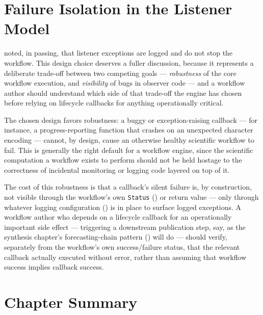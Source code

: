 \section{Failure Isolation in the Listener Model}

 noted, in passing, that listener exceptions are logged
and do not stop the workflow. This design choice deserves a fuller
discussion, because it represents a deliberate trade-off between two
competing goals --- \emph{robustness} of the core workflow execution, and
\emph{visibility} of bugs in observer code --- and a workflow author should
understand which side of that trade-off the engine has chosen before relying
on lifecycle callbacks for anything operationally critical.

The chosen design favors robustness: a buggy or exception-raising callback
--- for instance, a progress-reporting function that crashes on an
unexpected character encoding --- cannot, by design, cause an otherwise
healthy scientific workflow to fail. This is generally the right default for
a workflow engine, since the scientific computation a workflow exists to
perform should not be held hostage to the correctness of incidental
monitoring or logging code layered on top of it.

\begin{cautionbox}
The cost of this robustness is that a callback's silent failure is, by
construction, not visible through the workflow's own \texttt{Status}
() or return value --- only through whatever logging
configuration () is in place to surface logged
exceptions. A workflow author who depends on a lifecycle callback for an
operationally important side effect --- triggering a downstream publication
step, say, as the synthesis chapter's forecasting-chain pattern
() will do --- should verify, separately from the
workflow's own success/failure status, that the relevant callback actually
executed without error, rather than assuming that workflow success implies
callback success.
\end{cautionbox}

\section{Chapter Summary}

